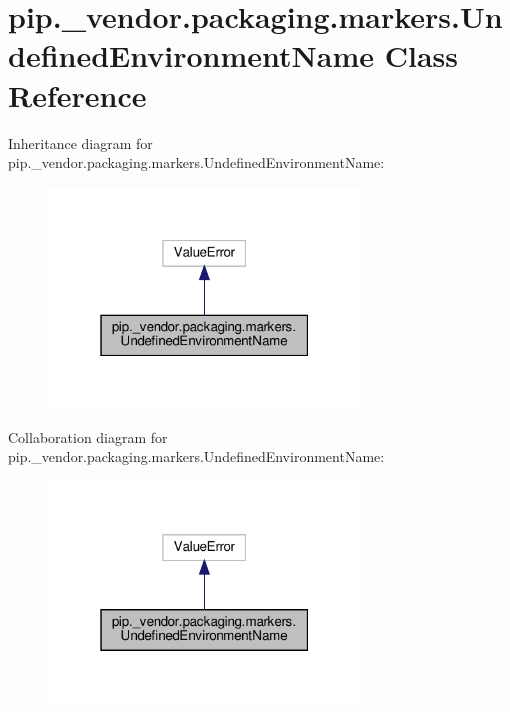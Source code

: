 \hypertarget{classpip_1_1__vendor_1_1packaging_1_1markers_1_1UndefinedEnvironmentName}{}\section{pip.\+\_\+vendor.\+packaging.\+markers.\+Undefined\+Environment\+Name Class Reference}
\label{classpip_1_1__vendor_1_1packaging_1_1markers_1_1UndefinedEnvironmentName}


Inheritance diagram for pip.\+\_\+vendor.\+packaging.\+markers.\+Undefined\+Environment\+Name\+:
\nopagebreak
\begin{figure}[H]
\begin{center}
\leavevmode
\includegraphics[width=235pt]{classpip_1_1__vendor_1_1packaging_1_1markers_1_1UndefinedEnvironmentName__inherit__graph}
\end{center}
\end{figure}


Collaboration diagram for pip.\+\_\+vendor.\+packaging.\+markers.\+Undefined\+Environment\+Name\+:
\nopagebreak
\begin{figure}[H]
\begin{center}
\leavevmode
\includegraphics[width=235pt]{classpip_1_1__vendor_1_1packaging_1_1markers_1_1UndefinedEnvironmentName__coll__graph}
\end{center}
\end{figure}


